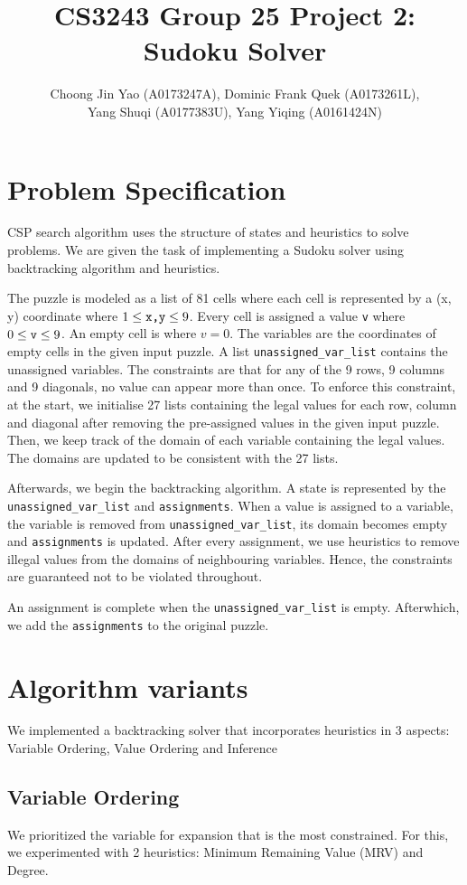 \documentclass[runningheads]{llncs}
\title{CS3243 Group 25 Project 2: Sudoku Solver}
\author{Choong Jin Yao (A0173247A), Dominic Frank Quek (A0173261L),\\ Yang Shuqi (A0177383U), Yang Yiqing (A0161424N)}
\institute{National University of Singapore}
\begin{document}
\maketitle

\section{Problem Specification}
CSP search algorithm uses the structure of states and heuristics to solve problems. We are given the task of implementing a Sudoku solver using backtracking algorithm and heuristics. 

The puzzle is modeled as a list of 81 cells where each cell is represented by a (x, y) coordinate where $ 1\leq \verb`x,y` \leq 9$. Every cell is assigned a value \verb`v` where  $ 0\leq \verb`v` \leq 9$. An empty cell is where $v = 0$. The variables are the coordinates of empty cells in the given input puzzle. A list \verb`unassigned_var_list` contains the unassigned variables. The constraints are that for any of the 9 rows, 9 columns and 9 diagonals, no value can appear more than once. To enforce this constraint, at the start, we initialise 27 lists containing the legal values for each row, column and diagonal after removing the pre-assigned values in the given input puzzle. Then, we keep track of the domain of each variable containing the legal values. The domains are updated to be consistent with the 27 lists. 

Afterwards, we begin the backtracking algorithm. A state is represented by the \verb`unassigned_var_list` and \verb`assignments`. When a value is assigned to a variable, the variable is removed from \verb`unassigned_var_list`, its domain becomes empty and \verb`assignments` is updated. After every assignment, we use heuristics to remove illegal values from the domains of neighbouring variables. Hence, the constraints are guaranteed not to be violated throughout.

An assignment is complete when the  \verb`unassigned_var_list` is empty. Afterwhich, we add the \verb`assignments` to the original puzzle.

\section{Algorithm variants}
We implemented a backtracking solver that incorporates heuristics in 3 aspects: Variable Ordering, Value Ordering and Inference

\subsection{Variable Ordering}
We prioritized the variable for expansion that is the most constrained. For this, we experimented with 2 heuristics: Minimum Remaining Value (MRV) and Degree.
\end{document}
